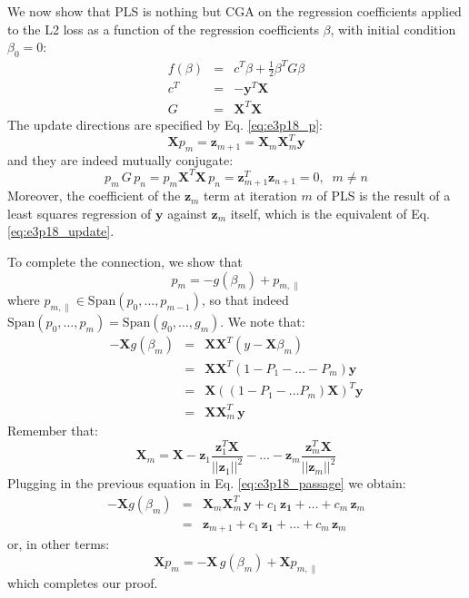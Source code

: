 We now show that PLS is nothing but CGA on the regression coefficients
applied to the L2 loss as a function of the regression coefficients
$\beta$, with initial condition $\beta_0 = 0$:
\begin{eqnarray*}
    f(\beta) & = & c^T \beta + \frac{1}{2} \beta^T G \beta \\
    c^T & = & - \mathbf{y}^T \mathbf{X} \\
    G & = & \mathbf{X}^T \mathbf{X}
\end{eqnarray*}
The update directions are specified by Eq. \ref{eq:e3p18_p}:
\begin{equation*}
\mathbf{X} p_m  =  \mathbf{z}_{m + 1} = \mathbf{X}_m \mathbf{X}_m^T \mathbf{y}
\end{equation*}
and they are indeed mutually conjugate:
\begin{equation}
p_m \, G \, p_n = p_m \mathbf{X}^T \mathbf{X} \, p_n = 
    \mathbf{z}_{m + 1} ^T \mathbf{z}_{n + 1} = 0, \;\; m \neq n
\end{equation}
Moreover, the coefficient of the $\mathbf{z}_m$ term at iteration $m$ of PLS
is the result of a least squares regression of $\mathbf{y}$ against
$\mathbf{z}_m$ itself, which is the equivalent of Eq. \ref{eq:e3p18_update}.

To complete the connection, we show that 
$$p_m = -g(\beta_m) + p_{m, \parallel}$$
where $p_{m, \parallel} \in \textrm{Span} \left(p_0, \ldots, p_{m - 1}\right)$,
so that indeed $\textrm{Span} \left(p_0, \ldots, p_m\right) = \textrm{Span} \left(g_0, \ldots, g_m\right)$. We note that:
\begin{eqnarray}
    - \mathbf{X} g(\beta_m) & = & \mathbf{X} \mathbf{X}^T \left(y - \mathbf{X} \beta_m\right) \\
    & = &  \mathbf{X} \mathbf{X}^T \left(1 - P_1 - \ldots - P_m\right) \mathbf{y} \\
    & = & \mathbf{X} \left((1 - P_1- \ldots P_m) \mathbf{X}\right)^T \mathbf{y} \\
    \label{eq:e3p18_passage}
    & = & \mathbf{X} \mathbf{X}_m^T\, \mathbf{y}
\end{eqnarray}
Remember that:
\begin{equation}
\mathbf{X}_m = \mathbf{X} 
    - \mathbf{z}_1 \frac{\mathbf{z}_1^T \mathbf{X}}{||\mathbf{z}_1||^2} - \ldots
    - \mathbf{z}_m \frac{\mathbf{z}_m^T \mathbf{X}}{||\mathbf{z}_m||^2}
\end{equation}
Plugging in the previous equation in Eq. \ref{eq:e3p18_passage} we obtain:
\begin{eqnarray*}
    - \mathbf{X} g(\beta_m) & = & \mathbf{X}_m \mathbf{X}_m^T\, \mathbf{y} + 
        c_1\, \mathbf{z_1} + \ldots + c_m\, \mathbf{z}_m \\
        & = & \mathbf{z}_{m + 1} + c_1\, \mathbf{z_1} + \ldots + c_m\, \mathbf{z}_m
\end{eqnarray*}
or, in other terms:
\begin{equation*}
\mathbf{X} p_m = - \mathbf{X}\, g(\beta_m) + \mathbf{X} p_{m, \parallel}
\end{equation*}
which completes our proof.
